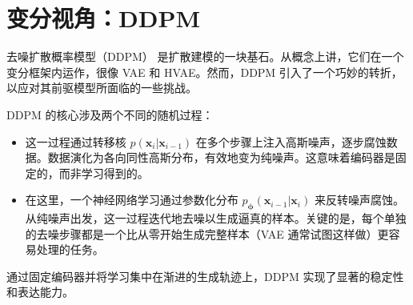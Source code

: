 \clearpage
\newpage

\section{变分视角：DDPM}\label{sec:ddpm}

去噪扩散概率模型（DDPM）\citep{sohl2015deep,ho2020denoising} 是扩散建模的一块基石。从概念上讲，它们在一个变分框架内运作，很像 VAE 和 HVAE。然而，DDPM 引入了一个巧妙的转折，以应对其前驱模型所面临的一些挑战。

DDPM 的核心涉及两个不同的随机过程：
\begin{itemize}
    \item {}这一过程通过转移核 $p(\mathbf{x}_{i}|\mathbf{x}_{i-1})$ 在多个步骤上注入高斯噪声，逐步腐蚀数据。数据演化为各向同性高斯分布，有效地变为纯噪声。这意味着编码器是固定的，而非学习得到的。
    \item {}在这里，一个神经网络学习通过参数化分布 $p_{\bm{\phi}}(\mathbf{x}_{i-1}|\mathbf{x}_{i})$ 来反转噪声腐蚀。从纯噪声出发，这一过程迭代地去噪以生成逼真的样本。关键的是，每个单独的去噪步骤都是一个比从零开始生成完整样本（VAE 通常试图这样做）更容易处理的任务。
\end{itemize}
通过固定编码器并将学习集中在渐进的生成轨迹上，DDPM 实现了显著的稳定性和表达能力。 

